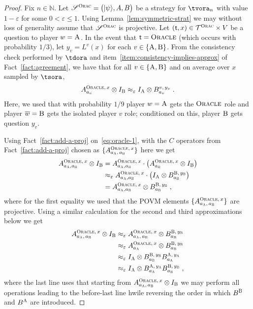 \documentclass[11pt]{article}
\theoremstyle{definition}
\newcommand{\ket}[1]{|#1\rangle}
\newcommand{\Id}{\ensuremath{I}}
\newcommand{\N}{\ensuremath{\mathbb{N}}}
\newcommand{\eps}{\varepsilon}
\newcommand{\strategy}{\mathscr{S}}
\newcommand{\type}{\mathcal{T}}
\newcommand{\gamestyle}[1]{\ensuremath{\textsc{#1}}\xspace}
\newcommand{\ora}{\gamestyle{Orac}}
\newcommand{\labelstyle}[1]{\ensuremath{\textsc{#1}}\xspace}
\newcommand{\tvarstyle}[1]{\mathsf{#1}}
\newcommand{\tvar}{\ensuremath{\tvarstyle{t}}}
\newcommand{\alice}{\labelstyle{A}}
\newcommand{\bob}{\labelstyle{B}}
\newcommand{\oracle}{\labelstyle{Oracle}}
\begin{document}
\begin{proof}
	Fix $n \in \N$.
  Let $\strategy^\ora = \bigl( \ket{\psi}, A, B \bigr)$ be a strategy
  for $\tvora_n$ with value $1 - \eps$ for some $0 < \eps \leq 1$. Using Lemma~\ref{lem:symmetric-strat} we may without loss of generality assume that $\strategy^\ora$ is projective. 
  Let $(\tvar,x) \in \type^\ora \times V$ be a question to player $w=\alice$.
  In the event that $\tvar = \oracle$ (which occurs with probability $1/3$), let
  $y_v = L^v(x)$ for each $v \in \{\alice,\bob\}$.
  From the consistency check performed by $\tdora$ and
  item~\ref{item:consistency-implies-approx} of Fact~\ref{fact:agreement}, we
  have that for all $v \in \{\alice,\bob\}$ and on average over $x$ sampled by
  $\tsora$,
  \begin{equation}
    \label{eq:oracle-1}
    A^{\oracle,\, x}_{a_v} \otimes \Id_\bob  \approx_\eps
    \Id_\alice \otimes B^{v,\, y_v}_{a_v}\;.
  \end{equation}     
  Here, we used that with probability $1/9$ player $w=\alice$ gets the $\oracle$
  role and player $\overline{w}=\bob$ gets the isolated player $v$ role;
  conditioned on this, player $\bob$ gets question $y_v$.
	
	Using 
	Fact~\ref{fact:add-a-proj} on~\eqref{eq:oracle-1}, with the $C$ operators from  Fact~\ref{fact:add-a-proj} chosen as $\{A^{\oracle,\, x}_{a_\alice,\,
    a_\bob}\}$ here we get
		  \begin{align}
   A^{\oracle,\, x}_{a_\alice,a_\bob} \otimes \Id_\bob  &=  A^{\oracle,\, x}_{a_\alice,a_\bob} \cdot\big( A^{\oracle,\, x}_{a_\bob} \otimes \Id_\bob \big) \notag\\
	&\approx_\eps
   A^{\oracle,\, x}_{a_\alice,a_\bob}\cdot\big( \Id_\alice \otimes B^{\bob,\, y_\bob}_{a_\bob}\big) \notag\\
	&= A^{\oracle,\, x}_{a_\alice,a_\bob}\otimes B^{\bob,\, y_\bob}_{a_\bob}\;,   \label{eq:oracle-1b}
  \end{align}   
		where for the first equality we used that the POVM elements $\{A^{\oracle,\, x}_{a_\alice,\,
    a_\bob}\}$ are projective. Using a similar calculation for the second and third approximations below we get
  \begin{equation}
    \label{eq:oracle-2}
    \begin{split}
      A^{\oracle,\, x}_{a_\alice,\, a_\bob} \otimes \Id_\bob
      & \approx_{\eps} A^{\oracle,\, x}_{a_\alice,\, a_\bob}  \otimes
      B^{\bob,\, y_\bob}_{a_\bob} \\
      &\approx_{\eps} A^{\oracle,\, x}_{a_\alice} \otimes
      B^{\bob,\, y_\bob}_{a_\bob} \\
      & \approx_\eps \Id_\alice \otimes
      B^{\bob,\, y_\bob}_{a_\bob} B^{\alice,\, y_\alice}_{a_\alice} \\
      & \approx_\eps \Id_\alice \otimes
      B^{\alice,\, y_\alice}_{a_\alice} B^{\bob,\, y_\bob}_{a_\bob}\;,
    \end{split}
  \end{equation}
	where the last line uses that starting from $A^{\oracle,\, x}_{a_\alice,\, a_\bob} \otimes \Id_\bob$ we may perform all operations leading to the before-last line hwile reversing the order in which $B^\bob$ and $B^\alice$ are introduced. 
	

\end{proof}
\end{document}
